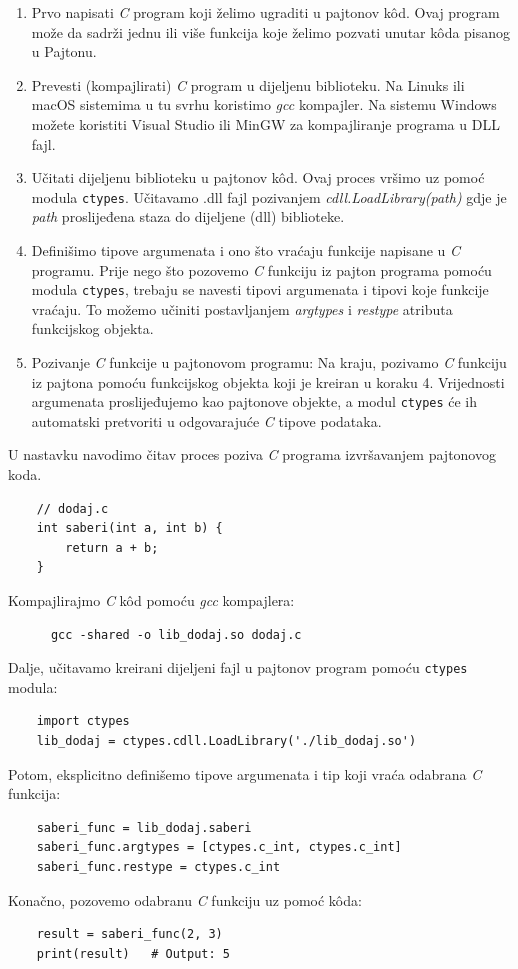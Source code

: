 \begin{enumerate}
	\item Prvo  napisati \textit{C} program koji želimo ugraditi u pajtonov   k\^od. Ovaj program može da sadrži jednu ili više funkcija koje želimo pozvati unutar k\^oda pisanog u Pajtonu.
	\item Prevesti (kompajlirati) \textit{C} program u dijeljenu biblioteku.    Na Linuks ili macOS  sistemima u tu svrhu koristimo \textit{gcc} kompajler. Na sistemu Windows možete koristiti Visual Studio ili MinGW za kompajliranje programa u DLL fajl.
	\item Učitati dijeljenu biblioteku u pajtonov k\^od. Ovaj proces vršimo uz  pomoć modula \texttt{ctypes}. Učitavamo .dll fajl pozivanjem \textit{cdll.LoadLibrary(path)} gdje je \textit{path} proslijeđena staza do dijeljene (dll) biblioteke.
	\item Definišimo tipove argumenata i ono što vraćaju funkcije napisane u \textit{C} programu. Prije nego što   pozovemo \textit{C} funkciju iz pajton programa pomoću modula \texttt{ctypes}, trebaju se navesti tipovi argumenata i tipovi koje funkcije vraćaju. To možemo učiniti postavljanjem \textit{argtypes} i \textit{restype} atributa funkcijskog objekta.
	\item Pozivanje \textit{C} funkcije u pajtonovom programu: Na kraju, pozivamo \textit{C} funkciju iz pajtona pomoću funkcijskog objekta koji je kreiran u koraku 4. Vrijednosti argumenata proslijeđujemo kao pajtonove objekte, a modul \texttt{ctypes} će ih automatski pretvoriti u odgovarajuće \textit{C} tipove podataka. 
\end{enumerate}

U nastavku navodimo čitav proces   poziva \textit{C} programa izvršavanjem pajtonovog koda.


\begin{verbatim}
	// dodaj.c
	int saberi(int a, int b) {
		return a + b;
	}
\end{verbatim}

Kompajlirajmo \textit{C} k\^od pomoću \textit{gcc} kompajlera:
\begin{verbatim}
	  gcc -shared -o lib_dodaj.so dodaj.c
\end{verbatim}
Dalje, učitavamo kreirani dijeljeni fajl u pajtonov program pomoću  \texttt{ctypes} modula:
\begin{verbatim}
	import ctypes
	lib_dodaj = ctypes.cdll.LoadLibrary('./lib_dodaj.so')
\end{verbatim}
Potom, eksplicitno definišemo tipove argumenata i tip koji vraća odabrana \textit{C} funkcija:
\begin{verbatim}
	saberi_func = lib_dodaj.saberi
	saberi_func.argtypes = [ctypes.c_int, ctypes.c_int]
	saberi_func.restype = ctypes.c_int
\end{verbatim}
Konačno, pozovemo odabranu \textit{C} funkciju uz pomoć k\^oda:
\begin{verbatim}
	result = saberi_func(2, 3)
	print(result)   # Output: 5
\end{verbatim}

